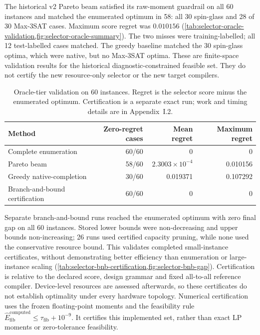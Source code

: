 \documentclass[a4paper,onecolumn,11pt,unpublished]{quantumarticle}
\theoremstyle{remark}
\begin{document}
The historical v2 Pareto beam satisfied its raw-moment guardrail on all 60
instances and matched the enumerated optimum in 58: all 30 spin-glass and
28 of 30 Max-3SAT cases. Maximum score regret was $0.010156$
(\cref{tab:selector-oracle-validation,fig:selector-oracle-summary}). The two
misses were training-labelled; all 12 test-labelled cases matched. The greedy
baseline matched the 30 spin-glass optima, which were native, but no Max-3SAT
optima. These are finite-space validation results for the historical diagnostic-constrained
feasible set. They do not certify the new resource-only selector or the new target compilers.

\begin{table}[!htbp]
\centering
\small
\caption{Oracle-tier validation on 60 instances. Regret is the selector
score minus the enumerated optimum. Certification is a separate exact run;
work and timing details are in Appendix~I.2.}
\label{tab:selector-oracle-validation}
\begin{tabular}{@{}lrrr@{}}
\toprule
Method & Zero-regret cases & Mean regret & Maximum regret\\
\midrule
Complete enumeration & 60/60 & 0 & 0\\
Pareto beam & 58/60 & $2.3003\times10^{-4}$ & 0.010156\\
Greedy native-completion & 30/60 & 0.019371 & 0.107292\\
Branch-and-bound certification & 60/60 & 0 & 0\\
\bottomrule
\end{tabular}

\end{table}

Separate branch-and-bound runs reached the enumerated optimum with zero
final gap on all 60 instances. Stored lower bounds were non-decreasing and
upper bounds non-increasing; 26 runs used certified capacity pruning, while
none used the conservative resource bound. This validates completed
small-instance certificates, without demonstrating better efficiency than
enumeration or large-instance scaling
(\cref{tab:selector-bnb-certification,fig:selector-bnb-gap}).
Certification is relative to the declared score, design grammar and fixed
all-to-all reference compiler. Device-level resources are assessed
afterwards, so these certificates do not establish optimality under every
hardware topology. Numerical certification uses the frozen floating-point moments
and the feasibility rule
$\widehat E_{\mathrm{fib}}^{\mathrm{computed}}\leq\tau_{\mathrm{fib}}+10^{-9}$.
It certifies this implemented set, rather than exact LP moments or zero-tolerance
feasibility.
\end{document}
